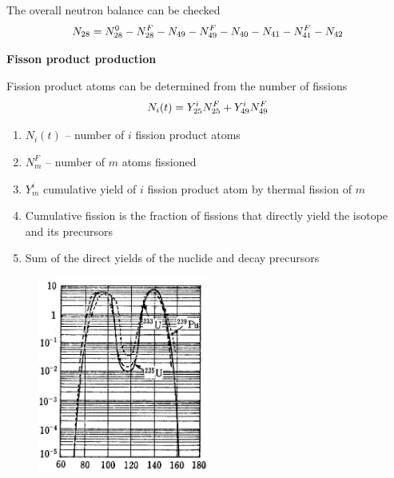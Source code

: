 \documentclass[aspectratio=1610,pdftex,dvipsnames,compress,xcolor={dvipsnames}]{beamer}
\begin{document}
\begin{frame}{The overall neutron balance can be checked}
    \begin{equation}
        \LARGE
        N_{28}=N_{28}^0-N_{28}^F-N_{49}-N_{49}^F-N_{40}-N_{41}-N_{41}^F-N_{42}
    \end{equation}
\end{frame}


\begin{frame}[plain]{}
    \centering\LARGE\textbf{Fisson product production}
\end{frame}


\addtocounter{framenumber}{-1} 
\begin{frame}{Fission product atoms can be determined from the number of fissions}
    \begin{equation}
        \LARGE
        N_i(t) = Y_{25}^iN_{25}^F + Y_{49}^iN_{49}^F
    \end{equation}
    
    \vspace*{\fill}

    \begin{enumerate}[series=outerlist,topsep=0pt,itemsep=21pt,leftmargin=*,label=(\arabic*)]
        \item[]$N_i(t)$ -- number of $i$ fission product atoms
        \item[]$N_m^F$ -- number of $m$ atoms fissioned
        \item[]$Y_m^i$ cumulative yield of $i$ fission product atom by thermal fission of $m$
        \item[]Cumulative fission is the fraction of fissions that directly yield the isotope and its precursors
        \item[]Sum of the direct yields of the nuclide and decay precursors
    \end{enumerate}
\end{frame}


\begin{frame}{}
    \begin{figure}
        \centering
        \includegraphics[width=0.50\textwidth]{the-fission.yield.jpg}
    \end{figure}
\end{frame}
\end{document}
